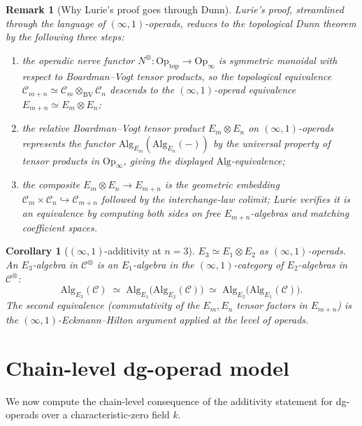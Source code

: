 \documentclass[11pt]{article}
\newtheorem{corollary}[theorem]{Corollary}
\newtheorem{remark}[theorem]{Remark}
\newcommand{\Cube}{\mathscr{C}}
\newcommand{\Alg}{\mathrm{Alg}}
\newcommand{\cC}{\mathcal{C}}
\newcommand{\into}{\hookrightarrow}
\begin{document}
\begin{remark}[Why Lurie's proof goes through Dunn]
Lurie's proof, streamlined through the language of
$(\infty, 1)$-operads, reduces to the topological Dunn theorem by the
following three steps:
\begin{enumerate}[label=(\roman*), leftmargin=*]
  \item the operadic nerve functor $N^{\otimes} \colon
    \mathrm{Op}_{\mathrm{top}} \to \mathrm{Op}_{\infty}$ is symmetric
    monoidal with respect to Boardman--Vogt tensor products, so the
    topological equivalence $\Cube_{m + n} \simeq \Cube_{m}
    \otimes_{\mathrm{BV}} \Cube_{n}$ descends to the
    $(\infty, 1)$-operad equivalence $E_{m + n} \simeq E_{m} \otimes
    E_{n}$;
  \item the relative Boardman--Vogt tensor product $E_{m} \otimes E_{n}$
    on $(\infty, 1)$-operads represents the functor
    $\Alg_{E_{m}}(\Alg_{E_{n}}(-))$ by the universal property of
    tensor products in $\mathrm{Op}_{\infty}$, giving the displayed
    $\Alg$-equivalence;
  \item the composite $E_{m} \otimes E_{n} \to E_{m + n}$ is the
    geometric embedding $\Cube_{m} \times \Cube_{n} \into \Cube_{m + n}$
    followed by the interchange-law colimit; Lurie verifies it is an
    equivalence by computing both sides on free $E_{m + n}$-algebras and
    matching coefficient spaces.
\end{enumerate}
\end{remark}

\begin{corollary}[$(\infty, 1)$-additivity at $n = 3$]
\label{cor:lurie-e3}
$E_{3} \simeq E_{1} \otimes E_{2}$ as $(\infty, 1)$-operads. An
$E_{3}$-algebra in $\cC^{\otimes}$ is an $E_{1}$-algebra in the
$(\infty, 1)$-category of $E_{2}$-algebras in $\cC^{\otimes}$:
\[
  \Alg_{E_{3}}(\cC) \;\simeq\; \Alg_{E_{1}}\bigl(\Alg_{E_{2}}(\cC)\bigr)
  \;\simeq\; \Alg_{E_{2}}\bigl(\Alg_{E_{1}}(\cC)\bigr).
\]
The second equivalence (commutativity of the $E_{m}, E_{n}$ tensor
factors in $E_{m + n}$) is the $(\infty, 1)$-Eckmann--Hilton
argument applied at the level of operads.
\end{corollary}

\section{Chain-level dg-operad model}
\label{sec:chain-level}

We now compute the chain-level consequence of the additivity statement
for dg-operads over a characteristic-zero field $k$.
\end{document}
